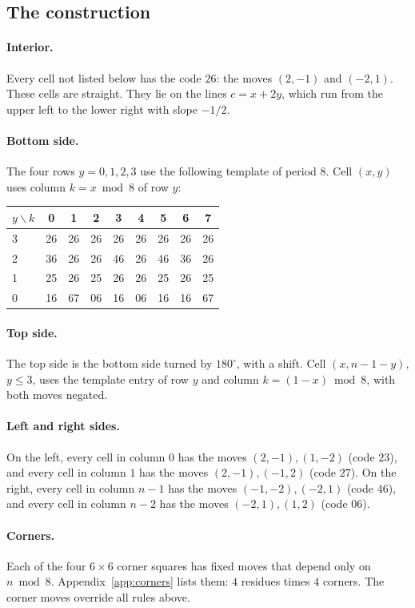 \documentclass[11pt]{article}
\theoremstyle{definition}
\theoremstyle{remark}
\begin{document}
\subsection{The construction}

\paragraph{Interior.}
Every cell not listed below has the code $26$: the moves $(2,-1)$ and $(-2,1)$.
These cells are straight.
They lie on the lines $c=x+2y$, which run from the upper left to the lower right with slope $-1/2$.

\paragraph{Bottom side.}
The four rows $y=0,1,2,3$ use the following template of period $8$.
Cell $(x,y)$ uses column $k=x\bmod 8$ of row $y$:
\begin{center}\ttfamily
\begin{tabular}{l|cccccccc}
\normalfont $y\backslash k$ & 0&1&2&3&4&5&6&7\\\midrule
3 & 26&26&26&26&26&26&26&26\\
2 & 36&26&26&46&26&46&36&26\\
1 & 25&26&25&26&26&25&26&25\\
0 & 16&67&06&16&06&16&16&67
\end{tabular}
\end{center}

\paragraph{Top side.}
The top side is the bottom side turned by $180^\circ$, with a shift.
Cell $(x,n-1-y)$, $y\le3$, uses the template entry of row $y$ and column $k=(1-x)\bmod 8$, with both moves negated.

\paragraph{Left and right sides.}
On the left, every cell in column $0$ has the moves $(2,-1),(1,-2)$ (code $23$), and every cell in column $1$ has the moves $(2,-1),(-1,2)$ (code $27$).
On the right, every cell in column $n-1$ has the moves $(-1,-2),(-2,1)$ (code $46$), and every cell in column $n-2$ has the moves $(-2,1),(1,2)$ (code $06$).

\paragraph{Corners.}
Each of the four $6\times6$ corner squares has fixed moves that depend only on $n\bmod 8$.
Appendix~\ref{app:corners} lists them: $4$ residues times $4$ corners.
The corner moves override all rules above.
\end{document}
